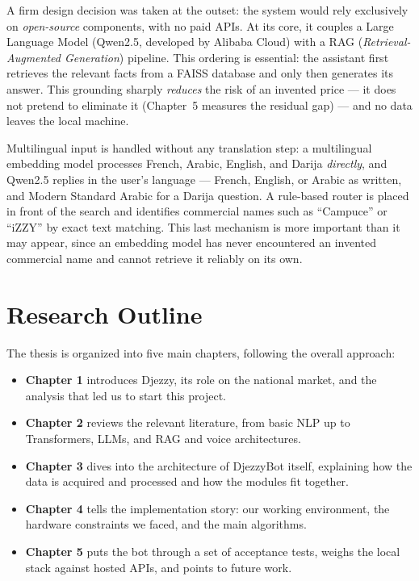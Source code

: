 \documentclass[12pt, a4paper]{report}
\newcommand{\humantext}[1]{#1}      %
\begin{document}
\humantext{A firm design decision was taken at the outset: the system would rely exclusively on \textit{open-source} components, with no paid APIs.} \humantext{At its core, it couples a Large Language Model (Qwen2.5, developed by Alibaba Cloud) with a RAG (\textit{Retrieval-Augmented Generation}) pipeline.} \humantext{This ordering is essential: the assistant first retrieves the relevant facts from a FAISS database and only then generates its answer. This grounding sharply \emph{reduces} the risk of an invented price --- it does not pretend to eliminate it (Chapter~5 measures the residual gap) --- and no data leaves the local machine.}

\humantext{Multilingual input is handled without any translation step: a multilingual embedding model processes French, Arabic, English, and Darija \emph{directly}, and Qwen2.5 replies in the user's language --- French, English, or Arabic as written, and Modern Standard Arabic for a Darija question. A rule-based router is placed in front of the search and identifies commercial names such as ``Campuce'' or ``iZZY'' by exact text matching. This last mechanism is more important than it may appear, since an embedding model has never encountered an invented commercial name and cannot retrieve it reliably on its own.}

\section*{Research Outline}
\humantext{The thesis is organized into five main chapters, following the overall approach:}
\begin{itemize}
    \item \humantext{\textbf{Chapter 1} introduces Djezzy, its role on the national market, and the analysis that led us to start this project.}
    \item \humantext{\textbf{Chapter 2} reviews the relevant literature, from basic NLP up to Transformers, LLMs, and RAG and voice architectures.}
    \item \humantext{\textbf{Chapter 3} dives into the architecture of DjezzyBot itself, explaining how the data is acquired and processed and how the modules fit together.}
    \item \humantext{\textbf{Chapter 4} tells the implementation story: our working environment, the hardware constraints we faced, and the main algorithms.}
    \item \humantext{\textbf{Chapter 5} puts the bot through a set of acceptance tests, weighs the local stack against hosted APIs, and points to future work.}
\end{itemize}
\end{document}
